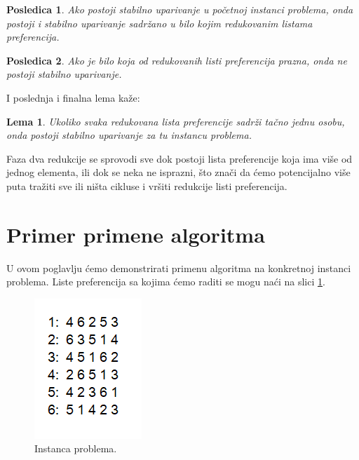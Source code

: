 \documentclass[a4paper]{article}
\newtheorem{lemma}{Lema}
\newtheorem{corollary}{Posledica}[lemma]  %
\begin{document}
\begin{corollary}
        Ako postoji stabilno uparivanje u početnoj instanci problema, onda postoji i stabilno uparivanje sadržano u bilo kojim redukovanim listama preferencija.
\end{corollary}

\begin{corollary}
        Ako je bilo koja od redukovanih listi preferencija prazna, onda ne postoji stabilno uparivanje.        
\end{corollary}

I poslednja i finalna lema kaže:

\begin{lemma}
    Ukoliko svaka redukovana lista preferencije sadrži tačno jednu osobu, onda postoji stabilno uparivanje za tu instancu problema.
\end{lemma}


Faza dva redukcije se sprovodi sve dok postoji lista preferencije koja ima više od jednog elementa, ili dok se neka ne isprazni, što znači da ćemo potencijalno više puta tražiti sve ili ništa cikluse i vršiti redukcije listi preferencija.

\newpage

\section{Primer primene algoritma}

U ovom poglavlju ćemo demonstrirati primenu algoritma na konkretnoj instanci problema. Liste preferencija sa kojima ćemo raditi se mogu naći na slici \ref{inst}.

\begin{figure}[h]
    \centering
    \includegraphics{instanca.png}
    \caption{Instanca problema.}
    \label{inst}
\end{figure}
\end{document}
